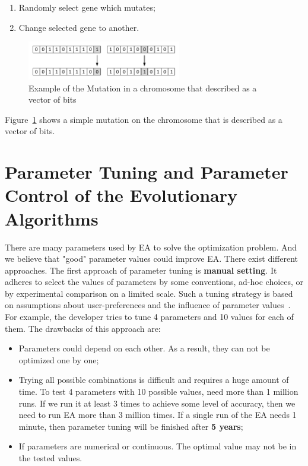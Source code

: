 \begin{enumerate}
	\item Randomly select gene which mutates;
	\item Change selected gene to another.
\end{enumerate}

\begin{figure}
	\centering
	\includegraphics[width=0.6\textwidth]{images/mutationVector.pdf}
	\caption[Example of the Mutation]{Example of the Mutation in a chromosome that described as a vector of bits}
	\label{fig:MutationVector}
\end{figure}

Figure~\ref{fig:MutationVector} shows a simple mutation on the chromosome that is described as a vector of bits.


\section{Parameter Tuning and Parameter Control of the Evolutionary Algorithms}

There are many parameters used by EA to solve the optimization problem. And we believe that "good" parameter values could improve EA. There exist different approaches. 
The first approach of parameter tuning is \textbf{manual setting}. It adheres to select the values of parameters by some conventions, ad-hoc choices, or by experimental comparison on a limited scale. Such a tuning strategy is based on assumptions about user-preferences and the influence of parameter values~\cite{eiben03,eiben11}. For example, the developer tries to tune 4 parameters and 10 values for each of them.
The drawbacks of this approach are:
\begin{itemize}
	\item Parameters could depend on each other. As a result, they can not be optimized one by one;
	\item Trying all possible combinations is difficult and requires a huge amount of time. To test 4 parameters with 10 possible values, need more than 1 million runs. If we run it at least 3 times to achieve some level of accuracy, then we need to run EA more than 3 million times. If a single run of the EA needs 1 minute, then parameter tuning will be finished after \textbf{5 years};
	\item If parameters are numerical or continuous. The optimal value may not be in the tested values.
\end{itemize}

